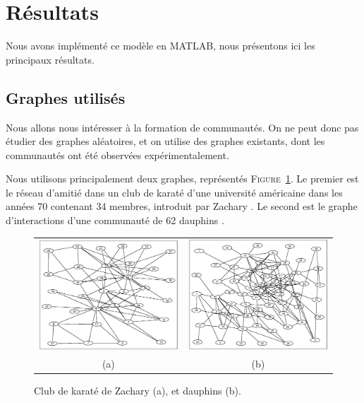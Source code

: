 \documentclass[12pt]{article}
\newcommand{\fig}[1]{\textsc{Figure}~\ref{#1}}
\begin{document}
\section{Résultats}
Nous avons implémenté ce modèle en \textsc{MATLAB}, nous présentons ici
les principaux résultats.


\subsection{Graphes utilisés}
Nous allons nous intéresser à la formation de communautés. On ne peut
donc pas étudier des graphes aléatoires, et on utilise des graphes
existants, dont les communautés ont été observées expérimentalement.

Nous utilisons principalement deux graphes, représentés
\fig{exemples_graphes}. Le premier est le réseau d'amitié dans un club
de karaté d'une université américaine dans les années 70 contenant 34
membres, introduit par Zachary \cite{zachary}. Le second est le graphe
d'interactions d'une communauté de 62 dauphins \cite{dolphins}.

\begin{figure}[htb]
	\begin{center}
		\begin{tabular}[h]{cc}
			\includegraphics[width=.4\textwidth]{zachary} &
			\includegraphics[width=.4\textwidth]{dolphins}
			\vspace{-5mm}
			\\
			(a) & (b)
		\end{tabular}
	\end{center}
	\caption{Club de karaté de Zachary (a), et dauphins (b).}
	\label{exemples_graphes}
\end{figure}
\end{document}
